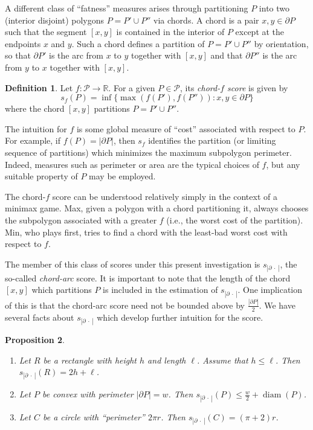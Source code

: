 \documentclass[]{jocg}
\newcommand{\RR}{\mathbb{R}}
\newcommand{\set}[1]{\{#1\}}
\newcommand{\abs}[1]{|#1|}
\newcommand{\chordarc}{s_{\abs{\partial~\cdot~}}}
\DeclareMathOperator{\diam}{\mathrm{diam}}
\newtheorem{proposition}{Proposition}[section]
\theoremstyle{definition}
\newtheorem{definition}[proposition]{Definition}
\theoremstyle{remark}
\begin{document}
A different class of ``fatness'' measures arises through partitioning $P$ into
two (interior disjoint) polygons $P = P' \cup P''$ via chords. A chord is a pair
$x,y \in \partial P$ such that the segment $[x,y]$ is contained in the interior
of $P$ except at the endpoints $x$ and $y$. Such a chord defines a partition of
$P = P' \cup P''$ by orientation, so that $\partial P'$ is the arc from $x$ to
$y$ together with $[x,y]$ and that $\partial P''$ is the arc from $y$ to $x$
together with $[x,y]$.

\begin{definition}
  Let $f : \mathcal{P} \to \RR$. For a given $P \in \mathcal{P}$, its
  \emph{chord-$f$ score} is given by
  \begin{equation*}
    s_f (P) = \inf \set{\max(f(P'), f(P'')) : x, y \in \partial P}
  \end{equation*}
  where the chord $[x,y]$ partitions $P = P' \cup P''$.
  \label{def:chord-f}
\end{definition}

The intuition for $f$ is some global measure of ``cost'' associated with respect
to $P$. For example, if $f(P) = \abs{\partial P}$, then $s_f$ identifies the
partition (or limiting sequence of partitions) which minimizes the maximum
subpolygon perimeter. Indeed, measures such as perimeter or area are the typical
choices of $f$, but any suitable property of $P$  may be employed. 

The chord-$f$ score can be understood relatively simply in the context of a
minimax game. Max, given a polygon with a chord partitioning it, always chooses
the subpolygon associated with a greater $f$ (i.e., the worst cost of the
partition). Min, who plays first, tries to find a chord with the least-bad worst
cost with respect to $f$.

The member of this class of scores under this present investigation is
$\chordarc$, the so-called \emph{chord-arc} score. It is important to note that
the length of the chord $[x,y]$ which partitions $P$ is included in the
estimation of $\chordarc$. One implication of this is that the chord-arc score
need not be bounded above by $\frac{\abs{\partial P}}{2}$.  We have several
facts about $\chordarc$ which develop further intuition for the score.
\begin{proposition}
  \begin{enumerate}
    \item Let $R$ be a rectangle with height $h$ and length $\ell$. Assume that
      $h \leq \ell$. Then $\chordarc(R) = 2h + \ell$.
    \item Let $P$ be convex with perimeter $\abs{\partial P} = w$. Then
      $\chordarc(P) \leq \frac{w}{2} + \diam (P)$.
    \item Let $C$ be a circle with ``perimeter'' $2\pi r$. Then $\chordarc(C) =
      (\pi + 2)r$.
  \end{enumerate}
  \label{rem:chordarc}
\end{proposition}
\end{document}
